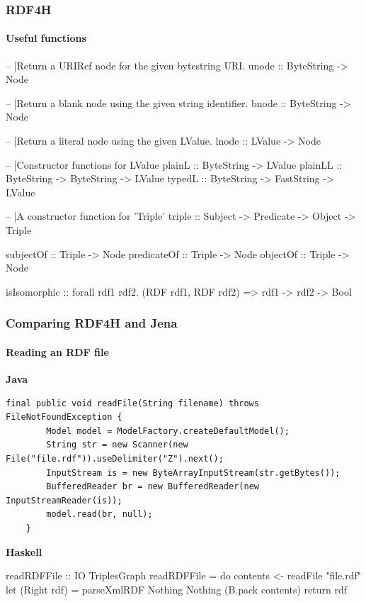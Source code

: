 \documentclass{beamer}
\begin{document}
\begin{frame}[fragile]
\frametitle{RDF4H}
\framesubtitle{Useful functions}

\begin{haskellcode}
-- |Return a URIRef node for the given bytestring URI.
unode :: ByteString -> Node

-- |Return a blank node using the given string identifier.
bnode :: ByteString ->  Node

-- |Return a literal node using the given LValue.
lnode :: LValue ->  Node

-- |Constructor functions for LValue
plainL :: ByteString -> LValue
plainLL :: ByteString -> ByteString -> LValue
typedL :: ByteString -> FastString -> LValue

-- |A constructor function for 'Triple'
triple :: Subject -> Predicate -> Object -> Triple

subjectOf :: Triple -> Node
predicateOf :: Triple -> Node
objectOf :: Triple -> Node

isIsomorphic :: forall rdf1 rdf2. (RDF rdf1, RDF rdf2) => rdf1 -> rdf2 -> Bool

\end{haskellcode}

\end{frame}


\begin{frame}[fragile]
\frametitle{Comparing RDF4H and Jena}
\framesubtitle{Reading an RDF file}


\textbf{Java}

\begin{lstlisting}[style=MyJavaStyle]
final public void readFile(String filename) throws FileNotFoundException {
        Model model = ModelFactory.createDefaultModel();
        String str = new Scanner(new File("file.rdf")).useDelimiter("Z").next();
        InputStream is = new ByteArrayInputStream(str.getBytes());
        BufferedReader br = new BufferedReader(new InputStreamReader(is));
        model.read(br, null);
    }
\end{lstlisting}

\bigskip
\textbf{Haskell}

\begin{haskellcode}
readRDFFile :: IO TriplesGraph
readRDFFile = do
  contents <- readFile "file.rdf"
  let (Right rdf) = parseXmlRDF Nothing Nothing (B.pack contents)
  return rdf
\end{haskellcode}

\end{frame}
\end{document}
